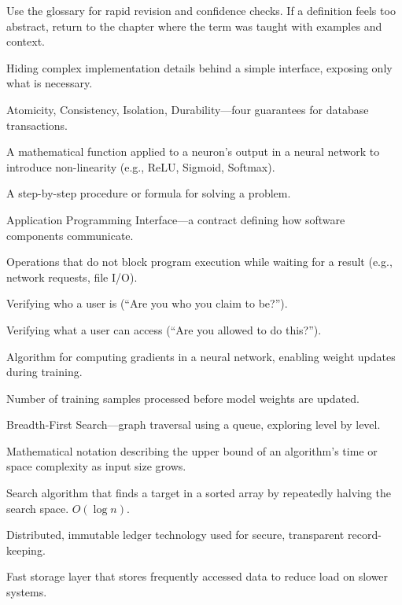 \documentclass[12pt, a4paper, oneside]{book}
\begin{document}
\begin{studybox}
Use the glossary for rapid revision and confidence checks. If a definition feels too abstract, return to the chapter where the term was taught with examples and context.
\end{studybox}

\begin{description}[leftmargin=2em, style=nextline]
    \item[Abstraction] Hiding complex implementation details behind a simple interface, exposing only what is necessary.
    \item[ACID] Atomicity, Consistency, Isolation, Durability---four guarantees for database transactions.
    \item[Activation Function] A mathematical function applied to a neuron's output in a neural network to introduce non-linearity (e.g., ReLU, Sigmoid, Softmax).
    \item[Algorithm] A step-by-step procedure or formula for solving a problem.
    \item[API] Application Programming Interface---a contract defining how software components communicate.
    \item[Asynchronous] Operations that do not block program execution while waiting for a result (e.g., network requests, file I/O).
    \item[Authentication] Verifying who a user is (``Are you who you claim to be?'').
    \item[Authorisation] Verifying what a user can access (``Are you allowed to do this?'').
    \item[Backpropagation] Algorithm for computing gradients in a neural network, enabling weight updates during training.
    \item[Batch Size] Number of training samples processed before model weights are updated.
    \item[BFS] Breadth-First Search---graph traversal using a queue, exploring level by level.
    \item[Big O Notation] Mathematical notation describing the upper bound of an algorithm's time or space complexity as input size grows.
    \item[Binary Search] Search algorithm that finds a target in a sorted array by repeatedly halving the search space. $O(\log n)$.
    \item[Blockchain] Distributed, immutable ledger technology used for secure, transparent record-keeping.
    \item[Cache] Fast storage layer that stores frequently accessed data to reduce load on slower systems.

\end{description}
\end{document}
